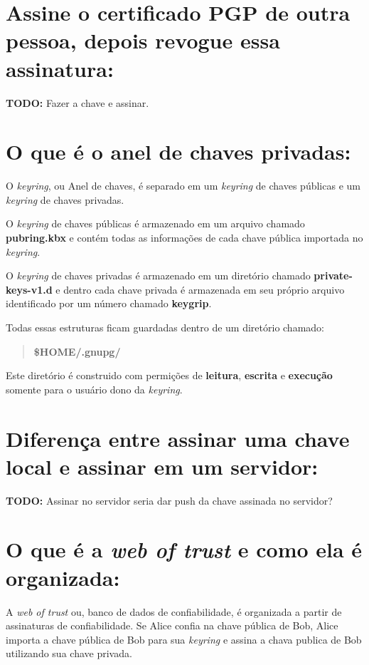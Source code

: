 \documentclass[12pt, letterpaper]{article}
\begin{document}
\section{Assine o certificado PGP de outra pessoa,
depois revogue essa assinatura:}

\textbf{TODO:} Fazer a chave e assinar.

\section{O que é o anel de chaves privadas:}

O \textit{keyring}, ou Anel de chaves, é separado em
um \textit{keyring} de chaves públicas e um \textit{keyring}
de chaves privadas.

O \textit{keyring} de chaves públicas é armazenado
em um arquivo chamado \textbf{pubring.kbx} e contém
todas as informações de cada chave pública importada
no \textit{keyring}.

O \textit{keyring} de chaves privadas é armazenado
em um diretório chamado \textbf{private-keys-v1.d}
e dentro cada chave privada é armazenada em seu
próprio arquivo identificado por um número chamado
\textbf{keygrip}.

Todas essas estruturas ficam guardadas dentro de
um diretório chamado:
\begin{quote}
  \textbf{\$HOME/.gnupg/}
\end{quote}
Este diretório é construido com permições de \textbf{leitura}, \textbf{escrita}
e \textbf{execução} somente para o usuário dono da \textit{keyring}.

\section{Diferença entre assinar uma chave local e assinar em um servidor:}

\textbf{TODO:} Assinar no servidor seria dar push da chave assinada no servidor?

\section{O que é a \textit{web of trust} e como ela é organizada:}

A \textit{web of trust} ou, banco de dados de confiabilidade,
é organizada a partir de assinaturas de confiabilidade.
Se Alice confia na chave pública de Bob, Alice importa
a chave pública de Bob para sua \textit{keyring} e
assina a chava publica de Bob utilizando sua chave privada.
\end{document}
